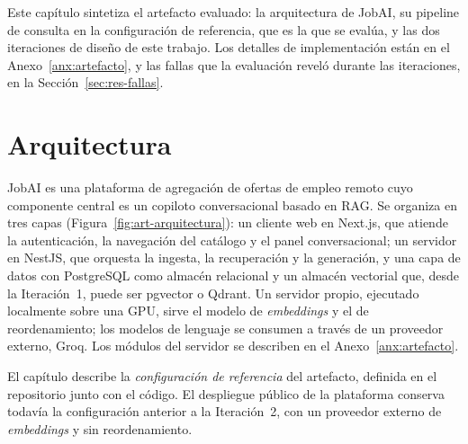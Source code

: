 Este capítulo sintetiza el artefacto evaluado: la arquitectura de JobAI, su pipeline de consulta en la configuración de referencia, que es la que se evalúa, y las dos iteraciones de diseño de este trabajo. Los detalles de implementación están en el Anexo~\ref{anx:artefacto}, y las fallas que la evaluación reveló durante las iteraciones, en la Sección~\ref{sec:res-fallas}.

\section{Arquitectura}
\label{sec:art-arquitectura}

JobAI es una plataforma de agregación de ofertas de empleo remoto cuyo componente central es un copiloto conversacional basado en RAG. Se organiza en tres capas (Figura~\ref{fig:art-arquitectura}): un cliente web en Next.js, que atiende la autenticación, la navegación del catálogo y el panel conversacional; un servidor en NestJS, que orquesta la ingesta, la recuperación y la generación, y una capa de datos con PostgreSQL como almacén relacional y un almacén vectorial que, desde la Iteración~1, puede ser pgvector o Qdrant. Un servidor propio, ejecutado localmente sobre una GPU, sirve el modelo de \textit{embeddings} y el de reordenamiento; los modelos de lenguaje se consumen a través de un proveedor externo, Groq. Los módulos del servidor se describen en el Anexo~\ref{anx:artefacto}.

El capítulo describe la \emph{configuración de referencia} del artefacto, definida en el repositorio junto con el código. El despliegue público de la plataforma conserva todavía la configuración anterior a la Iteración~2, con un proveedor externo de \textit{embeddings} y sin reordenamiento.

